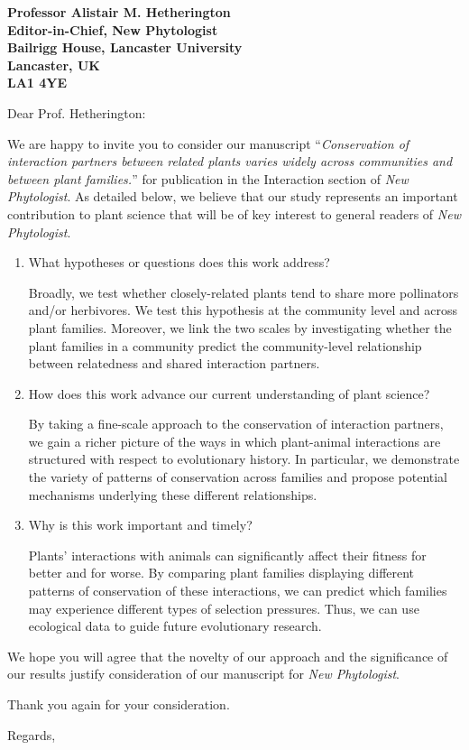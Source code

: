 \documentclass[12pt]{letter}
\newcommand{\mytitle}{\emph{Conservation of interaction partners between related plants varies widely across communities and between plant families.}}
\newcommand{\myjournal}{\emph{New Phytologist}}
\begin{document}
\begin{letter}{\bf Professor Alistair M. Hetherington\\
               Editor-in-Chief, New Phytologist\\
               Bailrigg House, Lancaster University\\
               Lancaster, UK\\
               LA1 4YE\\
                }

\opening{Dear Prof. Hetherington:}

We are happy to invite you to consider our manuscript 
``\mytitle'' for publication in the Interaction section of \myjournal. 
As detailed below, we believe that our study represents an important contribution
to plant science that will be of key interest to general readers of \myjournal.


\begin{enumerate}

\item What hypotheses or questions does this work address?


\smallskip 
Broadly, we test whether closely-related plants tend to share more
pollinators and/or herbivores. We test this hypothesis at the community level
and across plant families. Moreover, we link the two scales by investigating
whether the plant families in a community predict the community-level
relationship between relatedness and shared interaction partners. 
\smallskip


\item How does this work advance our current understanding of plant science?


\smallskip 
By taking a fine-scale approach to the conservation of interaction
partners, we gain a richer picture of the ways in which plant-animal
interactions are structured with respect to evolutionary history. In
particular, we demonstrate the variety of patterns of conservation across
families and propose potential mechanisms underlying these different
relationships. 
\smallskip


\item Why is this work important and timely?


\smallskip 
Plants' interactions with animals can significantly affect their
fitness for better and for worse. By comparing plant families displaying
different patterns of conservation of these interactions, we can predict which
families may experience different types of selection pressures. Thus, we can
use ecological data to guide future evolutionary research.


\end{enumerate}


We hope you will agree that the novelty of our approach and the significance
of our results justify consideration of our manuscript for \myjournal.

Thank you again for your consideration.

\closing{Regards,}


\end{letter}


\end{document}
